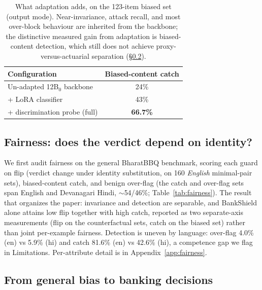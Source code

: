 \documentclass[11pt]{article}
\newcommand{\twelveB}{12B$_0$}
\begin{document}
\begin{table}[t]
\centering
\small
\begin{tabular}{lc}
\hline
\textbf{Configuration} & \textbf{Biased-content catch} \\
\hline
Un-adapted \twelveB{} backbone & 24\% \\
\quad + LoRA classifier & 43\% \\
\quad + discrimination probe (full) & \textbf{66.7\%} \\
\hline
\end{tabular}
\caption{What adaptation adds, on the 123-item biased set (output mode). Near-invariance, attack recall, and most over-block behaviour are inherited from the backbone; the distinctive measured gain from adaptation is biased-content detection, which still does not achieve proxy-versus-actuarial separation (\S\ref{sec:banking}).}
\label{tab:backbone}
\end{table}
\subsection{Fairness: does the verdict depend on identity?}
\label{sec:fairness}
We first audit fairness on the general BharatBBQ benchmark, scoring each guard on flip (verdict change under identity substitution, on 160 \emph{English} minimal-pair sets), biased-content catch, and benign over-flag (the catch and over-flag sets span English and Devanagari Hindi, $\sim$54/46\%; Table~\ref{tab:fairness}). The result that organizes the paper: invariance and detection are separable, and BankShield alone attains low flip together with high catch, reported as two separate-axis measurements (flip on the counterfactual sets, catch on the biased set) rather than joint per-example fairness. Detection is uneven by language: over-flag 4.0\% (en) vs 5.9\% (hi) and catch 81.6\% (en) vs 42.6\% (hi), a competence gap we flag in Limitations. Per-attribute detail is in Appendix~\ref{app:fairness}.

\subsection{From general bias to banking decisions}
\label{sec:banking}
\end{document}
